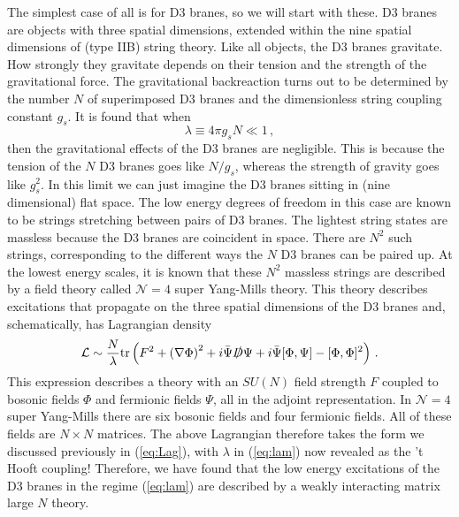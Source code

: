 \documentclass[10pt, oneside]{book}
\def\be{\begin{equation}}
\def\ee{\end{equation}}
\newcommand{\tr}{{\rm tr} }
\def\Lag{{\mathcal{L}}}
\begin{document}
\begin{doublespace}
The simplest case of all is for D3 branes, so we will start with these. D3 branes are objects with three spatial dimensions, extended within the nine spatial dimensions of (type IIB) string theory.  Like all objects, the D3 branes gravitate. How strongly they gravitate depends on their tension and the strength of the gravitational force. The gravitational backreaction turns out to be determined by the number $N$ of superimposed D3 branes and the dimensionless string coupling constant $g_s$. It is found that when
\be\label{eq:lam}
\lambda \equiv 4 \pi g_s N \ll 1 \,,
\ee
then the gravitational effects of the D3 branes are negligible. This is because the tension of the $N$ D3 branes goes like $N/g_s$, whereas the strength of gravity goes like $g_s^2$. In this limit we can just imagine the D3 branes sitting in (nine dimensional) flat space. The low energy degrees of freedom in this case are known to be strings stretching between pairs of D3 branes. The lightest string states are massless because the D3 branes are coincident in space. There are $N^2$ such strings, corresponding to the different ways the $N$ D3 branes can be paired up. At the lowest energy scales, it is known that these $N^2$ massless strings are described by a field theory called ${\mathcal N} = 4$ super Yang-Mills theory. This theory describes excitations that propagate on the three spatial dimensions of the D3 branes and, schematically, has Lagrangian density
\be\label{eq:Nis4}
\Lag \sim \frac{N}{\lambda} \tr \left( F^2 + \left( \nabla \Phi \right)^2 + i {\bar \Psi} \slashed{D} \Psi + i {\bar \Psi} [\Phi,\Psi] - [\Phi,\Phi]^2 \right) \,.
\ee
This expression describes a theory with an $SU(N)$ field strength $F$ coupled to bosonic fields $\Phi$ and fermionic fields $\Psi$, all in the adjoint representation. In ${\mathcal N} = 4$ super Yang-Mills there are six bosonic fields and four fermionic fields. All of these fields are $N \times N$ matrices. The above Lagrangian therefore takes the form we discussed previously in (\ref{eq:Lag}), with $\lambda$ in (\ref{eq:lam}) now revealed as the 't Hooft coupling! Therefore, we have found that the low energy excitations of the D3 branes in the regime (\ref{eq:lam}) are described by a weakly interacting matrix large $N$ theory.


\end{doublespace}
\end{document}

